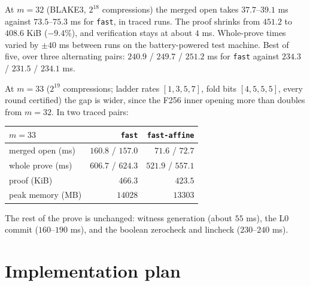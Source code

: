 \documentclass[11pt]{article}
\begin{document}
At $m = 32$ (BLAKE3, $2^{18}$ compressions) the merged open takes
$37.7$--$39.1$ ms against $73.5$--$75.3$ ms for \texttt{fast}, in
traced runs. The proof shrinks from $451.2$ to $408.6$ KiB ($-9.4\%$),
and verification stays at about $4$ ms. Whole-prove times varied by
$\pm 40$ ms between runs on the battery-powered test machine. Best of
five, over three alternating pairs: $240.9$ / $249.7$ / $251.2$ ms for
\texttt{fast} against $234.3$ / $231.5$ / $234.1$ ms.

At $m = 33$ ($2^{19}$ compressions; ladder rates $[1,3,5,7]$, fold bits
$[4,5,5,5]$, every round certified) the gap is wider, since the F256
inner opening more than doubles from $m = 32$. In two traced pairs:
\begin{center}
\begin{tabular}{lrr}
\toprule
$m = 33$ & \texttt{fast} & \texttt{fast-affine} \\
\midrule
merged open (ms) & $160.8$ / $157.0$ & $71.6$ / $72.7$ \\
whole prove (ms) & $606.7$ / $624.3$ & $521.9$ / $557.1$ \\
proof (KiB) & $466.3$ & $423.5$ \\
peak memory (MB) & $14028$ & $13303$ \\
\bottomrule
\end{tabular}
\end{center}
The rest of the prove is unchanged: witness generation (about
$55$ ms), the L0 commit ($160$--$190$ ms), and the boolean zerocheck
and lincheck ($230$--$240$ ms).

\section{Implementation plan}\label{sec:plan}
\end{document}
